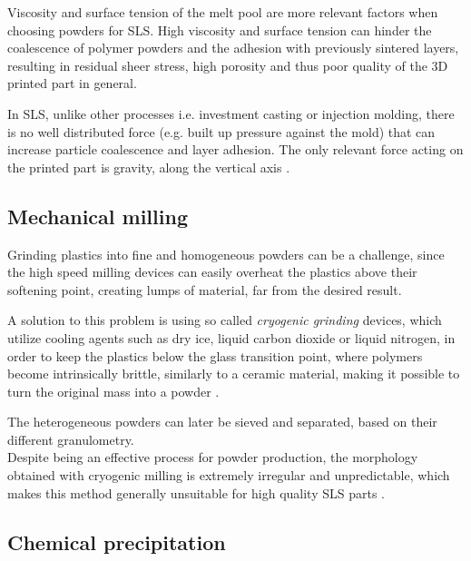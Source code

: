 \documentclass{article}
\begin{document}
    Viscosity and surface tension of the melt pool are more relevant factors when choosing powders for SLS. 
    High viscosity and surface tension can hinder the coalescence of polymer powders and the adhesion with previously 
    sintered layers, resulting in residual sheer stress, high porosity and thus poor quality of the 3D printed part in general. 
    
    In SLS, unlike other processes i.e. investment casting or injection molding, there is no well distributed force
    (e.g. built up pressure against the mold) that can increase particle coalescence and layer adhesion. The only relevant
    force acting on the printed part is gravity, along the vertical axis \autocite*{doi:10.1063/1.4918516}. 

    \subsection{Mechanical milling \label{Mechanical_milling}}

    Grinding plastics into fine and homogeneous powders can be a challenge, since the high speed milling devices can easily overheat the 
    plastics above their softening point, creating lumps of material, far from the desired result.
    
    A solution to this problem is using so called \textit{cryogenic grinding} devices, which utilize cooling agents such as dry ice, liquid 
    carbon dioxide or liquid nitrogen, in order to keep the plastics below the glass transition point, where polymers become intrinsically
    brittle, similarly to a ceramic material, making it possible to turn the original mass into a powder \autocites*{cryogenic_grinding_video}{Junghare_cryogenic_grinding_review}. 

    The heterogeneous powders can later be sieved and separated, based on their different granulometry. \\ 

    Despite being an effective process for powder production, the morphology obtained with cryogenic milling is extremely irregular 
    and unpredictable, which makes this method generally unsuitable for high quality SLS parts \autocite*{doi:10.1063/1.4918516}. 

    \subsection{Chemical precipitation \label{Chemical precipitation}}
\end{document}
